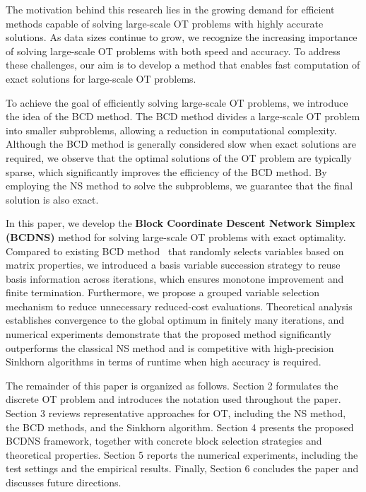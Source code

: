 \documentclass[12pt,a4paper]{article}
\begin{document}
The motivation behind this research lies in the growing demand for efficient methods capable of solving large-scale OT problems with highly accurate solutions. As data sizes continue to grow, we recognize the increasing importance of solving large-scale OT problems with both speed and accuracy. To address these challenges, our aim is to develop a method that enables fast computation of exact solutions for large-scale OT problems.

To achieve the goal of efficiently solving large-scale OT problems, we introduce the idea of the BCD method. The BCD method divides a large-scale OT problem into smaller subproblems, allowing a reduction in computational complexity. Although the BCD method is generally considered slow when exact solutions are required, we observe that the optimal solutions of the OT problem are typically sparse, which significantly improves the efficiency of the BCD method. By employing the NS method to solve the subproblems, we guarantee that the final solution is also exact.


In this paper, we develop the \textbf{Block Coordinate Descent Network Simplex (BCDNS)} method for solving large-scale OT problems with exact optimality.
Compared to existing BCD method~\cite{xie2023randomized} that randomly selects variables based on matrix properties, we introduced a basis variable succession strategy to reuse basis information across iterations, which ensures monotone improvement and finite termination.
Furthermore, we propose a grouped variable selection mechanism to reduce unnecessary reduced-cost evaluations.
Theoretical analysis establishes convergence to the global optimum in finitely many iterations,
and numerical experiments demonstrate that the proposed method significantly outperforms the classical NS method and is competitive with high-precision
Sinkhorn algorithms in terms of runtime when high accuracy is required.




The remainder of this paper is organized as follows.
Section 2 formulates the discrete OT problem and introduces the notation used throughout the paper.
Section 3 reviews representative approaches for OT, including the NS method, the BCD methods, and the Sinkhorn algorithm.
Section 4 presents the proposed BCDNS framework, together with concrete block selection strategies and theoretical properties.
Section 5 reports the numerical experiments, including the test settings and the empirical results.
Finally, Section 6 concludes the paper and discusses future directions.
\end{document}
